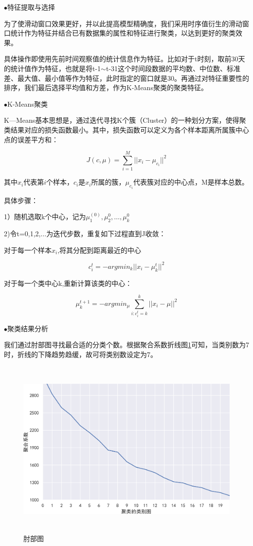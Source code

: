 \documentclass[withoutpreface,bwprint]{cumcmthesis}
\begin{document}
$\bullet$特征提取与选择

   为了使滑动窗口效果更好，并以此提高模型精确度，我们采用时序值衍生的滑动窗口统计作为特征并结合已有数据集的属性和特征进行聚类，以达到更好的聚类效果。

   具体操作即使用先前时间观察值的统计信息作为特征。比如对于t时刻，取前30天的统计值作为特征，也就是将t-1$\sim$t-31这个时间段数据的平均数、中位数、标准差、最大值、最小值等作为特征，此时指定的窗口就是30。再通过对特征重要性的排序，我们最后选择平均值和方差，作为K-Means聚类的聚类特征。

$\bullet$K-Means聚类

     K—Means基本思想是，通过迭代寻找K个簇（Cluster）的一种划分方案，使得聚类结果对应的损失函数最小。其中，损失函数可以定义为各个样本距离所属簇中心点的误差平方和：

     $$J(c,\mu)=\sum_{i=1}^M ||x_i-\mu_{c_i}||^2$$

     其中$x_i$代表第$i$个样本，$c_i$是$x_i$所属的簇，$\mu_{c_i}$代表簇对应的中心点，M是样本总数。

     具体步骤：

     1）随机选取k个中心，记为$\mu_1^{(0)} , \mu_2^{0} , \dots, \mu_k^{0}$

     2)令t=0,1,2,$\dots$为迭代步数，重复如下过程直到J收敛：

     对于每一个样本$x_i$,将其分配到距离最近的中心

     $$c_i^t = -argmin_k ||x_i-\mu_k^t||^2$$

     对于每一个类中心k,重新计算该类的中心：

     $$\mu_k^{t+1} = -argmin_{\mu}  \sum_{i:c_i^t=k}^k ||x_i-\mu||^2$$

    $\bullet$聚类结果分析
   
   我们通过肘部图寻找最合适的分类个数。根据聚合系数折线图\ref{肘部图}可知，当类别数为7时，折线的下降趋势趋缓，故可将类别数设定为7。
   
   
    \begin{figure}[htbp]
     \centering
     \includegraphics[width=15cm,height=9cm]{figure/肘部图.png}%
     \caption{肘部图}
     \label{肘部图}
    \end{figure}
    
\end{document}
